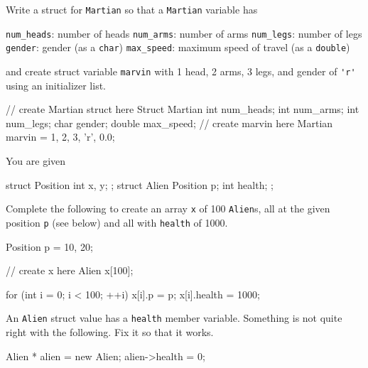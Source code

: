 

\nextq
Write a struct for \verb!Martian! so that a \verb!Martian!
variable has
\begin{enumerate}[nosep]
\li \verb!num_heads!: number of heads
\li \verb!num_arms!: number of arms
\li \verb!num_legs!: number of legs
\li \verb!gender!: gender (as a \verb!char!)
\li \verb!max_speed!: maximum speed of travel (as a \verb!double!)
\end{enumerate}
and create struct variable \verb!marvin! with 1 head, 2 arms, 3 legs,
and gender of \verb!'r'! using an initializer list.
\\
\ANSWER
\begin{answercode}
// create Martian struct here
Struct Martian
{
  int num_heads;
  int num_arms;
  int num_legs;
  char gender;
  double max_speed;
}
// create marvin here
Martian marvin = {1, 2, 3, 'r', 0.0};
\end{answercode}

\nextq
You are given
\begin{console}[fontsize=\footnotesize]
struct Position
{
    int x, y;
};
struct Alien
{
    Position p;
    int health;
};
\end{console}
Complete the following to create an array \verb!x! of 100 \verb!Alien!s,
all at the given position \verb!p! (see below) and all with \verb!health!
of 1000.
\\
\ANSWER
\begin{answercode}
Position p = {10, 20};

// create x here
Alien x[100];

for (int i = 0; i < 100; ++i)
{
  x[i].p = p;
  x[i].health = 1000;
}
\end{answercode}

\nextq
An \verb!Alien! struct value has a \verb!health! member variable.
Something is not quite right with the following. Fix it so that it works.
\\
\ANSWER
\begin{answercode}
Alien * alien = new Alien;
alien->health = 0;
\end{answercode}


